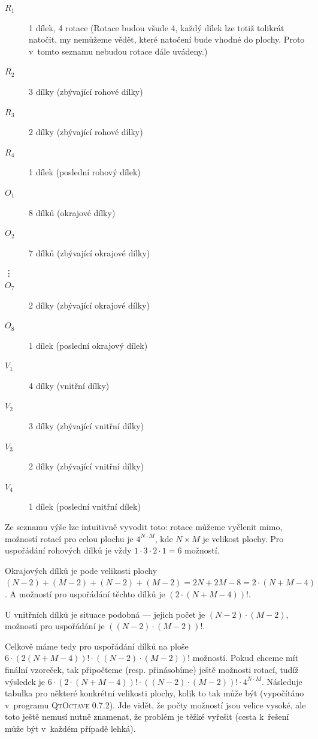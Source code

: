 \documentclass[11pt, titlepage]{report}
\begin{document}
\begin{description}
\item[$R_1$] 1 dílek, 4 rotace (Rotace budou všude 4, každý dílek lze totiž tolikrát natočit, my nemůžeme vědět, které natočení bude vhodné do plochy. Proto v~tomto seznamu nebudou rotace dále uvádeny.)
\item[$R_2$] 3 dílky (zbývající rohové dílky)
\item[$R_3$] 2 dílky (zbývající rohové dílky)
\item[$R_4$] 1 dílek (poslední rohový dílek)
\item[$O_1$] 8 dílků (okrajové dílky)
\item[$O_2$] 7 dílků (zbývající okrajové dílky)
\item[\vdots]
\item[$O_7$] 2 dílky (zbývající okrajové dílky)
\item[$O_8$] 1 dílek (poslední okrajový dílek)
\item[$V_1$] 4 dílky (vnitřní dílky)
\item[$V_2$] 3 dílky (zbývající vnitřní dílky)
\item[$V_3$] 2 dílky (zbývající vnitřní dílky)
\item[$V_4$] 1 dílek (poslední vnitřní dílek)
\end{description}

Ze seznamu výše lze intuitivně vyvodit toto: rotace můžeme vyčlenit mimo, možností rotací pro celou plochu je $4^{N \cdot M}$, kde $N \times M$ je velikost plochy. Pro uspořádání rohových dílků je vždy $1 \cdot 3 \cdot 2 \cdot 1 = 6$ možností.

Okrajových dílků je pode velikosti plochy $(N - 2) + (M - 2) + (N - 2) + (M - 2) = 2N + 2M - 8 = 2 \cdot (N + M - 4)$. A možností pro uspořádání těchto dílků je $(2 \cdot (N + M - 4))!$.

U vnitřních dílků je situace podobná --- jejich počet je $(N - 2) \cdot (M - 2)$, možností pro uspořádání je $((N - 2) \cdot (M - 2))!$.

Celkově máme tedy pro uspořádání dílků na ploše $6 \cdot (2(N + M - 4))! \cdot ((N - 2) \cdot (M - 2))!$ možností. Pokud chceme mít finální vzoreček, tak připočteme (resp. přinásobíme) ještě možnosti rotací, tudíž výsledek je $6 \cdot (2 \cdot (N + M - 4))! \cdot ((N - 2) \cdot (M - 2))! \cdot 4^{N \cdot M}$. Následuje tabulka pro některé konkrétní velikosti plochy, kolik to tak může být (vypočítáno v~programu \textsc{QtOctave 0.7.2}). Jde vidět, že počty možností jsou velice vysoké, ale toto ještě nemusí nutně znamenat, že problém je těžké vyřešit (cesta k~řešení může být v~každém případě lehká).
\end{document}
